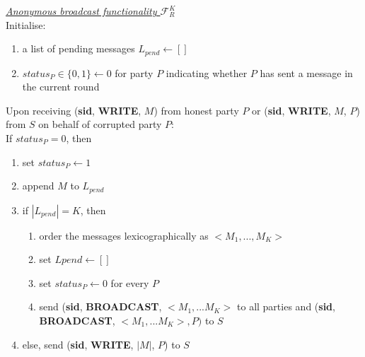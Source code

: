 \begin{tcolorbox}[enhanced, colback=white, arc=5pt, breakable]
\noindent\emph{\underline{Anonymous broadcast functionality $\mathcal{F}_R^K$}}\\[5pt]
 Initialise:
 \begin{enumerate}
     \item a list of pending messages $L_{pend} \leftarrow []$
     \item $status_P\in\{0,1\}\leftarrow 0$ for party $P$ indicating whether $P$ has sent a message in the current round
 \end{enumerate}
 
 
\extitem Upon receiving (\textbf{sid}, \textbf{WRITE}, $M$) from honest party $P$ or (\textbf{sid}, \textbf{WRITE}, $M$, $P$) from $S$ on behalf of corrupted party $P$:\\
If $status_P=0$, then
\begin{enumerate}
    \item set $status_P\leftarrow 1$
    \item append $M$ to $L_{pend}$
    \item if $|L_{pend}|=K$, then
    \begin{enumerate}
        \item order the messages lexicographically as $<M_1,...,M_K>$
        \item set $L{pend}\leftarrow []$
        \item set $status_P\leftarrow 0$ for every $P$
        \item send (\textbf{sid}, \textbf{BROADCAST}, $<M_1,...M_K>$ to all parties and (\textbf{sid}, \textbf{BROADCAST}, $<M_1,...M_K>, P)$ to $S$
    \end{enumerate}
    \item else, send (\textbf{sid}, \textbf{WRITE}, $|M|$, $P$) to $S$
\end{enumerate}





\end{tcolorbox}
\label{fig:riposte_functionality}